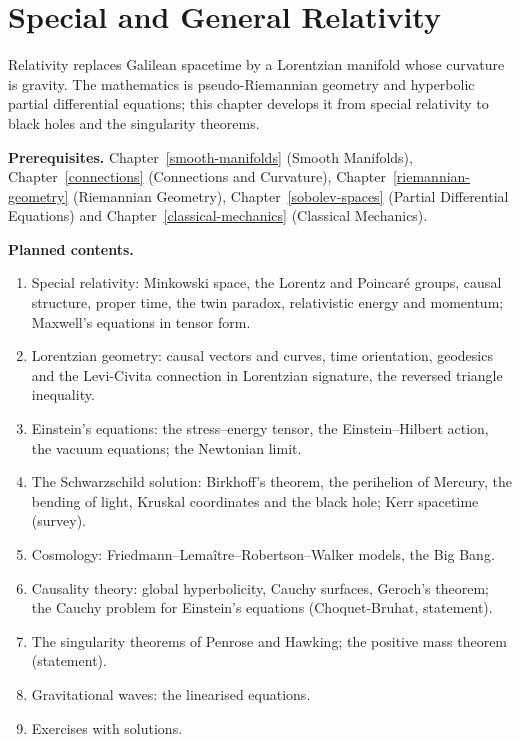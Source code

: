 \chapter{Special and General Relativity}\label{general-relativity}

Relativity replaces Galilean spacetime by a Lorentzian manifold whose curvature is gravity. The
mathematics is pseudo-Riemannian geometry and hyperbolic partial differential equations; this chapter
develops it from special relativity to black holes and the singularity theorems.

\noindent\textbf{Prerequisites.} Chapter~\ref{smooth-manifolds} (Smooth Manifolds), Chapter~\ref{connections} (Connections and Curvature), Chapter~\ref{riemannian-geometry} (Riemannian Geometry), Chapter~\ref{sobolev-spaces} (Partial Differential Equations) and Chapter~\ref{classical-mechanics} (Classical Mechanics).

\noindent\textbf{Planned contents.}
\begin{enumerate}
\item Special relativity: Minkowski space, the Lorentz and Poincar\'e groups, causal structure,
proper time, the twin paradox, relativistic energy and momentum; Maxwell's equations in tensor form.
\item Lorentzian geometry: causal vectors and curves, time orientation, geodesics and the
Levi-Civita connection in Lorentzian signature, the reversed triangle inequality.
\item Einstein's equations: the stress--energy tensor, the Einstein--Hilbert action, the vacuum
equations; the Newtonian limit.
\item The Schwarzschild solution: Birkhoff's theorem, the perihelion of Mercury, the bending of light,
Kruskal coordinates and the black hole; Kerr spacetime (survey).
\item Cosmology: Friedmann--Lema\^itre--Robertson--Walker models, the Big Bang.
\item Causality theory: global hyperbolicity, Cauchy surfaces, Geroch's theorem; the Cauchy problem
for Einstein's equations (Choquet-Bruhat, statement).
\item The singularity theorems of Penrose and Hawking; the positive mass theorem (statement).
\item Gravitational waves: the linearised equations.
\item Exercises with solutions.
\end{enumerate}
